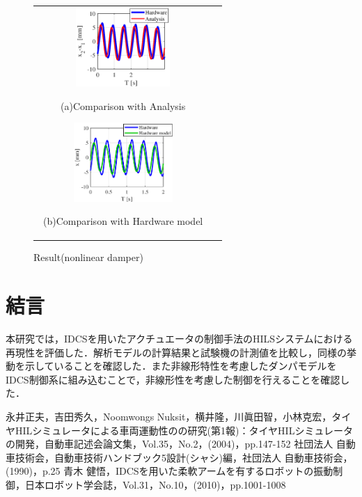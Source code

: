 \documentclass{article_vdlab_sotsuron_youshi}
\begin{document}
\vspace*{2mm}
\begin{figure}[h]
  \begin{tabular}{cc}
  \begin{minipage}[t]{0.5\hsize}
  \begin{center}
    \includegraphics[height=30mm]{figure/sus_nonlinear_5_3.eps}
    \end{center}
    \begin{center}
      \vspace{-4mm}
    \ (a)Comparison with Analysis\
    \end{center}
  \end{minipage}
  \begin{minipage}[t]{0.5\hsize}
     \begin{center}
      \includegraphics[height=30mm]{figure/idcs_nonlinear_5_3.eps}
      \end{center}
      \begin{center}
        \vspace{-4mm}
      \ (b)Comparison with Hardware model\
    \end{center}
  \end{minipage}
  \end{tabular}
  \caption{Result(nonlinear damper)}
    \label{fig:idcs_nonlinear}
\end{figure}

\section{結言}
本研究では，IDCSを用いたアクチュエータの制御手法のHILSシステムにおける再現性を評価した．解析モデルの計算結果と試験機の計測値を比較し，同様の挙動を示していることを確認した．また非線形特性を考慮したダンパモデルをIDCS制御系に組み込むことで，非線形性を考慮した制御を行えることを確認した．

\begin{thebibliography}{99}
永井正夫，吉田秀久，Noomwongs Nuksit，横井隆，川眞田智，小林克宏，タイヤHILシミュレータによる車両運動性のの研究(第1報)：タイヤHILシミュレータの開発，自動車記述会論文集，Vol.35，No.2，(2004)，pp.147-152
\bibitem{2dof}社団法人 自動車技術会，自動車技術ハンドブック5設計(シャシ)編，社団法人 自動車技術会，(1990)，p.25
\bibitem{method_idcs}青木 健悟，IDCSを用いた柔軟アームを有するロボットの振動制御，日本ロボット学会誌，Vol.31，No.10，(2010)，pp.1001-1008
\end{thebibliography}
\end{document}

